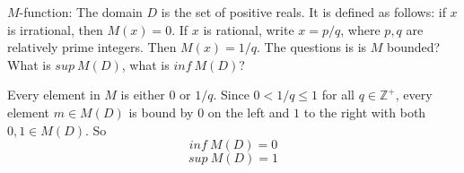 \documentclass[boxes, qed]{homework}
\begin{document}
\newenvironment{amatrix}[1]{%
  \left[\begin{array}{@{}*{#1}{c}|c@{}}
}{%
  \end{array}\right]
}

\newenvironment{augmatrix}[1]{%
  \left[\begin{array}{#1}
}{%
  \end{array}\right]
}

\begin{problem}$M$-function: The domain $D$ is the set of positive reals. 
  It is defined as follows: if $x$ is irrational, then $M(x)=0$. 
  If $x$ is rational, write $x= p/ q$, where $p, q$ are relatively prime integers. 
  Then $M(x)=1/ q$. The questions is is $M$ bounded? 
  What is $sup\ M(D)$, what is $inf\ M(D)$?
\end{problem}
\begin{solution}Every element in $M$ is either $0$ or $1/q$.
  Since $0<1/q\le{1}$ for all $q\in\mathbb{Z^+}$, every element $m\in{M(D)}$
  is bound by $0$ on the left and $1$ to the right with 
  both $0,1\in{M(D)}$. So
  $$inf\ M(D)=0$$
  $$sup\ M(D)=1$$
\end{solution}
\end{document}
